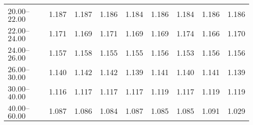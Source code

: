 \begin{table}[htp]
\begin{tiny}
\begin{center}
\begin{tabular}{|l|c|c|c|c|c|c|c|c|}
$20.00$--$22.00$ & 1.187 & 1.187 & 1.186 & 1.184 & 1.186 & 1.184 & 1.186 & 1.186  \\
$22.00$--$24.00$ & 1.171 & 1.169 & 1.171 & 1.169 & 1.169 & 1.174 & 1.166 & 1.170  \\
$24.00$--$26.00$ & 1.157 & 1.158 & 1.155 & 1.155 & 1.156 & 1.153 & 1.156 & 1.156  \\
$26.00$--$30.00$ & 1.140 & 1.142 & 1.142 & 1.139 & 1.141 & 1.140 & 1.141 & 1.139  \\
$30.00$--$40.00$ & 1.116 & 1.117 & 1.117 & 1.117 & 1.119 & 1.117 & 1.119 & 1.119  \\
$40.00$--$60.00$ & 1.087 & 1.086 & 1.084 & 1.087 & 1.085 & 1.085 & 1.091 & 1.029  \\
\hline
\end{tabular} 
             \end{center} 
             \end{tiny} 
             \label{tab:sa_trpp_psi2s} 
             \end{table}


